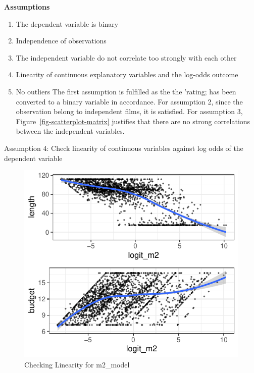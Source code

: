 \documentclass[
  letterpaper,
  DIV=11,
  numbers=noendperiod]{scrartcl}
\begin{document}
\textbf{Assumptions}

\begin{enumerate}
\def\labelenumi{\arabic{enumi}.}
\item
  The dependent variable is binary
\item
  Independence of observations
\item
  The independent variable do not correlate too strongly with each other
\item
  Linearity of continuous explanatory variables and the log-odds outcome
\item
  No outliers \clearpage The first assumption is fulfilled as the the
  'rating; has been converted to a binary variable in accordance. For
  assumption 2, since the observation belong to independent films, it is
  satisfied. For assumption 3, Figure~\ref{fig-scatterplot-matrix}
  justifies that there are no strong correlations between the
  independent variables.
\end{enumerate}

Assumption 4: Check linearity of continuous variables against log odds
of the dependent variable

\begin{figure}

{\centering \includegraphics{Group_06_Analysis_files/figure-pdf/fig-lin-m2-1.pdf}

}

\caption{\label{fig-lin-m2}Checking Linearity for m2\_model}

\end{figure}
\end{document}
